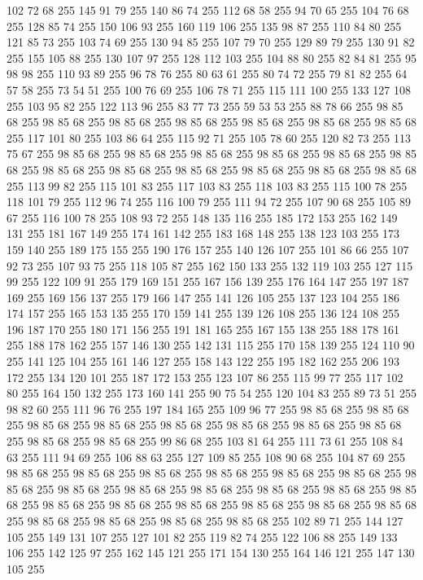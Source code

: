 102 72 68 255 145 91 79 255 140 86 74 255 112 68 58 255 94 70 65 255 104 76 68 255 128 85 74 255 150 106 93 255 160 119 106 255 135 98 87 255 110 84 80 255 121 85 73 255 103 74 69 255 130 94 85 255 107 79 70 255 129 89 79 255 130 91 82 255 155 105 88 255 130 107 97 255 128 112 103 255 104 88 80 255 82 84 81 255 95 98 98 255 110 93 89 255 96 78 76 255 80 63 61 255 80 74 72 255 79 81 82 255 64 57 58 255 73 54 51 255 100 76 69 255 106 78 71 255 115 111 100 255 133 127 108 255 103 95 82 255 122 113 96 255 83 77 73 255 59 53 53 255 88 78 66 255 98 85 68 255 98 85 68 255 98 85 68 255 98 85 68 255 98 85 68 255 98 85 68 255 98 85 68 255 117 101 80 255 103 86 64 255 115 92 71 255 105 78 60 255 120 82 73 255 113 75 67 255 98 85 68 255 98 85 68 255 98 85 68 255 98 85 68 255 98 85 68 255 98 85 68 255 98 85 68 255 98 85 68 255 98 85 68 255 98 85 68 255 98 85 68 255 98 85 68 255
113 99 82 255 115 101 83 255 117 103 83 255 118 103 83 255 115 100 78 255 118 101 79 255 112 96 74 255 116 100 79 255 111 94 72 255 107 90 68 255 105 89 67 255 116 100 78 255 108 93 72 255 148 135 116 255 185 172 153 255 162 149 131 255 181 167 149 255 174 161 142 255 183 168 148 255 138 123 103 255 173 159 140 255 189 175 155 255 190 176 157 255 140 126 107 255 101 86 66 255 107 92 73 255 107 93 75 255 118 105 87 255 162 150 133 255 132 119 103 255 127 115 99 255 122 109 91 255 179 169 151 255 167 156 139 255 176 164 147 255 197 187 169 255 169 156 137 255 179 166 147 255 141 126 105 255 137 123 104 255 186 174 157 255 165 153 135 255 170 159 141 255 139 126 108 255 136 124 108 255 196 187 170 255 180 171 156 255 191 181 165 255 167 155 138 255 188 178 161 255 188 178 162 255 157 146 130 255 142 131 115 255 170 158 139 255 124 110 90 255 141 125 104 255 161 146 127 255 158 143 122 255 195 182 162 255 206 193 172 255 134 120 101 255 187 172 153 255 123 107 86 255 115 99 77 255
117 102 80 255 164 150 132 255 173 160 141 255 90 75 54 255 120 104 83 255 89 73 51 255 98 82 60 255 111 96 76 255 197 184 165 255 109 96 77 255 98 85 68 255 98 85 68 255 98 85 68 255 98 85 68 255 98 85 68 255 98 85 68 255 98 85 68 255 98 85 68 255 98 85 68 255 98 85 68 255 99 86 68 255 103 81 64 255 111 73 61 255 108 84 63 255 111 94 69 255 106 88 63 255 127 109 85 255 108 90 68 255 104 87 69 255 98 85 68 255 98 85 68 255 98 85 68 255 98 85 68 255 98 85 68 255 98 85 68 255 98 85 68 255 98 85 68 255 98 85 68 255 98 85 68 255 98 85 68 255 98 85 68 255 98 85 68 255 98 85 68 255 98 85 68 255 98 85 68 255 98 85 68 255 98 85 68 255 98 85 68 255 98 85 68 255 98 85 68 255 98 85 68 255 98 85 68 255 102 89 71 255 144 127 105 255 149 131 107 255 127 101 82 255 119 82 74 255 122 106 88 255 149 133 106 255 142 125 97 255 162 145 121 255 171 154 130 255 164 146 121 255 147 130 105 255
